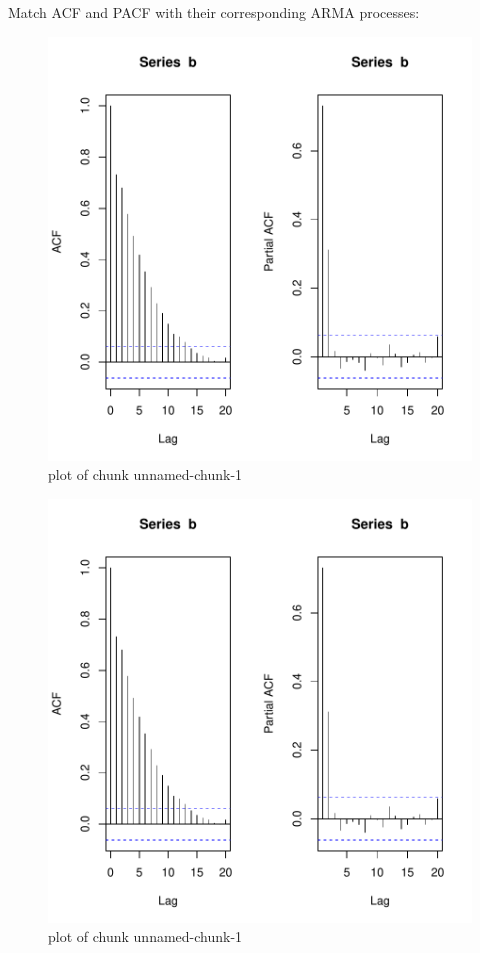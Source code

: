 
\begin{question}
Match ACF and PACF with their corresponding ARMA processes:


\begin{figure}[H]
	\centering
	\includegraphics{unnamed-chunk-1-2.pdf}
	\caption{plot of chunk unnamed-chunk-1}
\end{figure}


\begin{figure}[H]
	\centering
	\includegraphics{unnamed-chunk-1-2.pdf}
	\caption{plot of chunk unnamed-chunk-1}
\end{figure}



\end{question}
